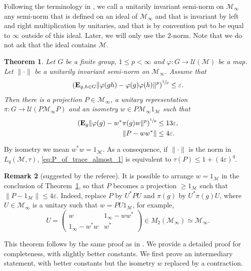 \documentclass[10pt]{amsart}
\theoremstyle{plain}
\newtheorem{theorem}{Theorem}[section]
\theoremstyle{definition}
\newtheorem{remark}[theorem]{Remark}
\newcommand{\cM}{\mathcal{M}}
\newcommand{\E}{\mathbf{E}}
\newcommand{\cU}{\mathcal{U}}
\begin{document}
Following the terminology in \cite{MR3867328}, we call a unitarily invariant semi-norm on $\cM_\infty$ any semi-norm that is defined on an ideal of $\cM_\infty$ and that is invariant by left and right multiplication by unitaries, and that is by convention put to be equal to $\infty$ outside of this ideal. Later, we will only use the $2$-norm. Note that we do not ask that the ideal contains $\cM$.
\begin{theorem}\label{thm:averageGowersHatami} Let $G$ be a finite group, $1 \leq p < \infty$ and $\varphi:G \to \cU(\cM)$ be a map. Let $\|{\cdot}\|$ be a unitarily invariant semi-norm on $\cM_\infty$. Assume that
\[
\left(\E_{g,h \in G} \|\varphi(gh)-\varphi(g)\varphi(h)\|^p\right)^{\sfrac 1 p} \leq \varepsilon.
\]
Then there is a projection $P \in \cM_\infty$, a unitary representation $\pi: G \to \cU(P\cM_\infty P)$ and an isometry $w \in P \cM_\infty 1_\cM$ such that
\begin{align}\label{eq:varphi_close_to_rep}
\left(\E_g \|\varphi(g)-w^* \pi(g) w\|^p\right)^{\sfrac 1 p}&\leq 13\varepsilon,
\\
\label{eq:P_of_trace_almost_1} \|P-ww^*\| &\leq 4\varepsilon.
\end{align}
\end{theorem}

By isometry we mean $w^*w=1_\cM$. As a consequence, if $\|{\cdot}\|$ is the norm in $L_q(\cM,\tau)$, \eqref{eq:P_of_trace_almost_1} is equivalent to $\tau(P) \leq 1+(4\varepsilon)^q$.

\begin{remark}[suggested by the referee]\label{rem:added_by_referee}
It is possible to arrange $w=1_\cM$ in the conclusion of Theorem~\ref{thm:averageGowersHatami}, so that $P$ becomes a projection $\geq 1_\cM$ such that \hbox{$\|P-1_\cM\|\leq 4\varepsilon$}. Indeed, replace $P$ by $U^* P U$ and $\pi(g)$ by $U^* \pi(g) U$, where $U \in \cM_\infty$ is a unitary such that $w=PU 1_\cM$, for example,
\[
U=\begin{pmatrix} w & 1_\infty - ww^*\\1_\infty-w^*w& w^*\end{pmatrix} \in M_2(\cM_\infty) \simeq \cM_\infty.
\]
\end{remark}

This theorem follows by the same proof as in \cite{MR3867328}. We provide a detailed proof for completeness, with slightly better constants. We first prove an intermediary statement, with better constants but the isometry $w$ replaced by a contraction.
\end{document}
